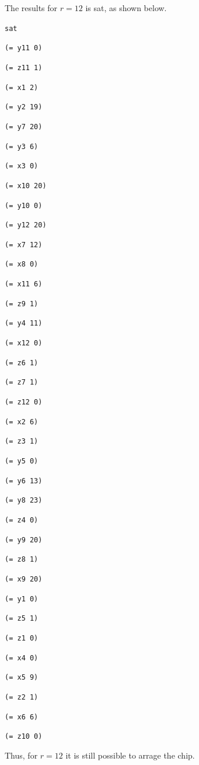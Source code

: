 \documentclass[12pt]{article}
\begin{document}
The results for $r=12$ is sat, as shown below.
{ \footnotesize
{\tt sat }

{\tt  }

{\tt (= y11 0) }

{\tt (= z11 1) }

{\tt (= x1 2) }

{\tt (= y2 19) }

{\tt (= y7 20) }

{\tt (= y3 6) }

{\tt (= x3 0) }

{\tt (= x10 20) }

{\tt (= y10 0) }

{\tt (= y12 20) }

{\tt (= x7 12) }

{\tt (= x8 0) }

{\tt (= x11 6) }

{\tt (= z9 1) }

{\tt (= y4 11) }

{\tt (= x12 0) }

{\tt (= z6 1) }

{\tt (= z7 1) }

{\tt (= z12 0) }

{\tt (= x2 6) }

{\tt (= z3 1) }

{\tt (= y5 0) }

{\tt (= y6 13) }

{\tt (= y8 23) }

{\tt (= z4 0) }

{\tt (= y9 20) }

{\tt (= z8 1) }

{\tt (= x9 20) }

{\tt (= y1 0) }

{\tt (= z5 1) }

{\tt (= z1 0) }

{\tt (= x4 0) }

{\tt (= x5 9) }

{\tt (= z2 1) }

{\tt (= x6 6) }

{\tt (= z10 0) }

{\tt  }
}

Thus, for $r=12$ it is still possible to arrage the chip.
\end{document}
